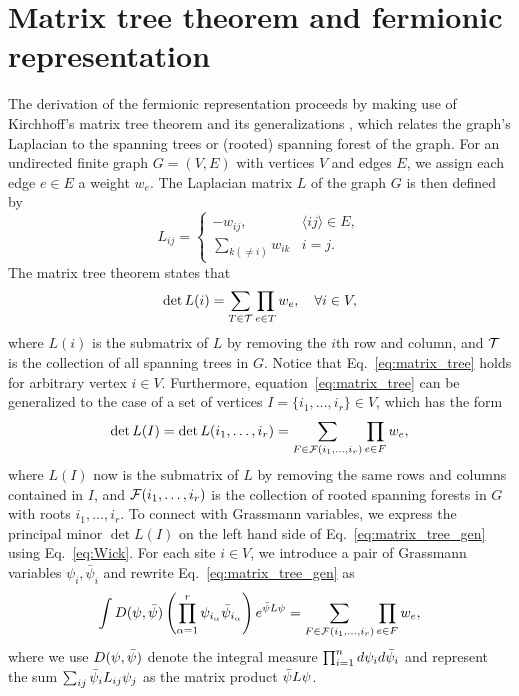 \section{Matrix tree theorem and fermionic representation}
The derivation of the fermionic representation proceeds by making use of Kirchhoff's matrix tree theorem \cite{Kirchhoff1847} and its
generalizations \cite{Chaiken1982, Moon1994}, which relates the graph's Laplacian to the spanning trees or (rooted) spanning forest of the graph. 
For an undirected finite graph $G = (V, E)$ with vertices $V$ and edges $E$, we assign each edge $e \in E$ a weight $w_e$. The Laplacian matrix $L$ of 
the graph $G$ is then defined by
\begin{equation}
	L_{ij} =
	\begin{cases}
	-w_{ij}, & \langle ij \rangle \in E, \\
	\sum_{k(\neq i)} w_{ik} & i = j.
	\end{cases}
\end{equation}
The matrix tree theorem states that
\begin{equation}\label{eq:matrix_tree}
	\operatorname{det} L(i) = \sum_{T \in {\mathcal T}} \prod_{e\in T} w_e, \quad \forall i \in V,
\end{equation}
where $L(i)$ is the submatrix of $L$ by removing the $i$th row and column, and ${\mathcal T}$ is the collection of all spanning trees in $G$.
Notice that Eq.~\eqref{eq:matrix_tree} holds for arbitrary vertex $i \in V$. Furthermore, equation~\eqref{eq:matrix_tree} can be 
generalized to the case of a set of vertices $I = \{i_1, \dots, i_r\} \in V$, which has the form
\begin{equation}\label{eq:matrix_tree_gen}
	\operatorname{det}L(I) = \operatorname{det}L (i_1, \dots, i_r) = \sum_{F \in {\mathcal F}(i_1, \dots, i_r)} \prod_{e \in F} w_e, 
\end{equation}
where $L(I)$ now is the submatrix of $L$ by removing the same rows and columns contained in $I$, and ${\mathcal F}(i_1, \dots, i_r)$ is the collection
of rooted spanning forests in $G$ with roots $i_1, \dots, i_r$.
To connect with Grassmann variables, we express the principal minor $\operatorname{det} L(I)$ on the left hand side of Eq.~\eqref{eq:matrix_tree_gen} using Eq.~\eqref{eq:Wick}.
For each site $i \in V$, we introduce a pair of Grassmann variables $\psi_i, \bar{\psi}_i$ and rewrite Eq.~\eqref{eq:matrix_tree_gen} as
\begin{equation}\label{eq:matrix_tree_Grassmann}
	\int D({\psi}, \bar{{\psi}})\left(\prod_{\alpha=1}^r \psi_{i_{\alpha}} \bar{\psi}_{i_{\alpha}}\right)e^{\bar{{\psi}} L {\psi}} 
	=\sum_{F \in {\mathcal F}(i_1, \dots, i_r)} \prod_{e \in F} w_e, 
\end{equation}
where we use $D({\psi}, \bar{{\psi}})$ denote the integral measure $\prod_{i=1}^n d{\psi}_i d\bar{{\psi}}_i$ and 
represent the sum $\sum_{ij} \bar{{\psi}}_i L_{ij} {\psi}_j$ as the matrix product $\bar{{\psi}} L {\psi}$. 

